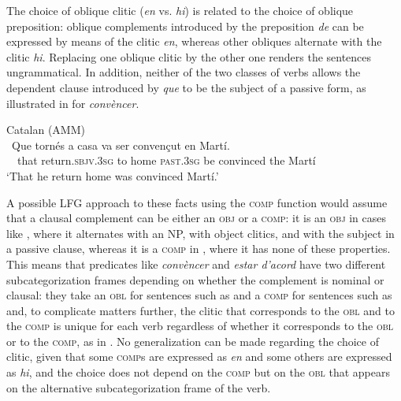 \documentclass[output=paper,hidelinks]{langscibook}
\begin{document}
The choice of oblique clitic (\textit{en} vs. \textit{hi}) is related to the choice of oblique preposition: oblique complements introduced by the preposition \textit{de} can be expressed by means of the clitic \textit{en}, whereas other obliques alternate with the clitic \textit{hi}. Replacing one oblique clitic by the other one renders the sentences ungrammatical. In addition, neither of the two classes of verbs allows the dependent clause introduced by \textit{que} to be the subject of a passive form, as illustrated in  for \textit{convèncer}.

\ea \label{ex:Romance:38} Catalan (AMM)\\
\gll *~Que tornés a casa va ser convençut en Martí.\\
   ~~that return\textsc{.sbjv.3sg} to home \textsc{past.3sg} be convinced the Martí\\
\glt `That he return home was convinced Martí.'
\z


A possible LFG approach to these facts using the \textsc{comp} function would assume that a clausal complement can be either an \textsc{obj} or a \textsc{comp}: it is an \textsc{obj} in cases like , where it alternates with an NP, with object clitics, and with the subject in a passive clause, whereas it is a \textsc{comp} in , where it has none of these properties. This means that predicates like \textit{convèncer} and \textit{estar d'acord} have two different subcategorization frames depending on whether the complement is nominal or clausal: they take an \textsc{obl} for sentences such as  and a \textsc{comp} for sentences such as  and, to complicate matters further, the clitic that corresponds to the \textsc{obl} and to the \textsc{comp} is unique for each verb regardless of whether it corresponds to the \textsc{obl} or to the \textsc{comp}, as in . No generalization can be made regarding the choice of clitic, given that some \textsc{comp}s are expressed as \textit{en} and some others are expressed as \textit{hi}, and the choice does not depend on the \textsc{comp} but on the \textsc{obl} that appears on the alternative subcategorization frame of the verb.
\end{document}
